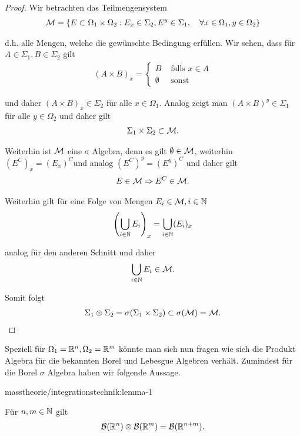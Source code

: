 \begin{proof}
 Wir betrachten das Teilmengensystem
\begin{align*}
\mathcal{M} = \{E\subset\Omega_1\times\Omega_2:  E_x\in\Sigma_2, E^y\in\Sigma_1,\quad\forall x\in\Omega_1,  y\in\Omega_2\}
\end{align*}
\par
d.h. alle Mengen, welche die gewünschte Bedingung erfüllen. Wir sehen, dass für \(A\in\Sigma_1,B\in\Sigma_2\) gilt
\begin{align*}
(A\times B)_x = 
\begin{cases}
B &\text{ falls }x\in A\\
\emptyset &\text{ sonst}
\end{cases}
\end{align*}
\par
und daher \((A\times B)_x\in\Sigma_2\) für alle \(x\in\Omega_1\). Analog zeigt man \((A\times B)^y\in\Sigma_1\) für alle \(y\in\Omega_2\) und daher gilt
\begin{align*}
\Sigma_1\times\Sigma_2\subset \mathcal{M}.
\end{align*}
\par
Weiterhin ist \(\mathcal{M}\) eine \(\sigma\) Algebra, denn es gilt \(\emptyset\in\mathcal{M}\), weiterhin \((E^C)_x = (E_x)^C\)und analog \((E^C)^y= (E^y)^C\) und daher
gilt
\begin{align*}
E\in\mathcal{M}\Rightarrow E^C\in\mathcal{M}.
\end{align*}
\par
Weiterhin gilt für eine Folge von Mengen \(E_i\in\mathcal{M},i\in\mathbb{N}\)
\begin{align*}
\left(\bigcup_{i\in\mathbb{N}} E_i\right)_x = \bigcup_{i\in\mathbb{N}} (E_i)_x
\end{align*}
\par
analog für den anderen Schnitt und daher
\begin{align*}
\bigcup_{i\in\mathbb{N}} E_i\in\mathcal{M}.
\end{align*}
\par
Somit folgt
\begin{align*}
\Sigma_1\otimes\Sigma_2=\sigma(\Sigma_1\times\Sigma_2)\subset \sigma(\mathcal{M}) = \mathcal{M}.
\end{align*}\end{proof}

\par
Speziell für \(\Omega_1=\mathbb{R}^n, \Omega_2=\mathbb{R}^m\) könnte man sich nun fragen wie sich die Produkt Algebra für die bekannten Borel und Lebesgue Algebren verhält. Zumindest für die Borel \(\sigma\) Algebra haben wir folgende Aussage.
\begin{lemma}{}{masstheorie/integrationstechnik:lemma-1}



\par
Für \(n,m\in\mathbb{N}\) gilt
\begin{align*}
\mathcal{B}(\mathbb{R}^n)\otimes \mathcal{B}(\mathbb{R}^m) = \mathcal{B}(\mathbb{R}^{n+m}).
\end{align*}\end{lemma}

